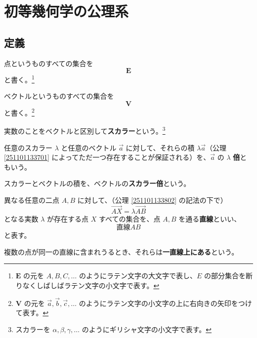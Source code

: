 \chapter{初等幾何学の公理系}

\section{定義}

\begin{dfn}[\(\bm{E}\)]
  点というものすべての集合を
  \[\bm{E}\]
  と書く。\footnote{\(\bm{E}\) の元を \(A,B,C,\ldots\) のようにラテン文字の大文字で表し、\(E\) の部分集合を断りなくしばしばラテン文字の小文字で表す。}
\end{dfn}

\begin{dfn}[\(\bm{V}\)]
  ベクトルというものすべての集合を
  \[\bm{V}\]
  と書く。\footnote{\(\bm{V}\) の元を \(\vec{a},\vec{b},\vec{c},\ldots\) のようにラテン文字の小文字の上に右向きの矢印をつけて表す。}
\end{dfn}

\begin{dfn}[スカラー]
  実数のことをベクトルと区別して\textbf{スカラー}という。\footnote{スカラーを \(\alpha,\beta,\gamma,\ldots\) のようにギリシャ文字の小文字で表す。}
\end{dfn}

\begin{dfn}[倍]
  任意のスカラー \(\lambda\) と任意のベクトル \(\vec{a}\) に対して、それらの積 \(\lambda\vec{a}\)（公理 \ref{251101133701} によってただ一つ存在することが保証される）を、\(\vec{a}\) の \(\lambda\) \textbf{倍}ともいう。
\end{dfn}

\begin{dfn}[スカラー倍]
  スカラーとベクトルの積を、ベクトルの\textbf{スカラー倍}という。
\end{dfn}

\begin{dfn}[直線]
  異なる任意の二点 \(A,B\) に対して、（公理 \ref{251101133802} の記法の下で）
  \[\overrightarrow{AX}=\lambda\overrightarrow{AB}\]
  となる実数 \(\lambda\) が存在する点 \(X\) すべての集合を、点 \(A,B\) を通る\textbf{直線}といい、
  \[\text{直線} AB\]
   と表す。
\end{dfn}

\begin{dfn}[一直線上にある]
  複数の点が同一の直線に含まれうるとき、それらは\textbf{一直線上にある}という。
\end{dfn}

